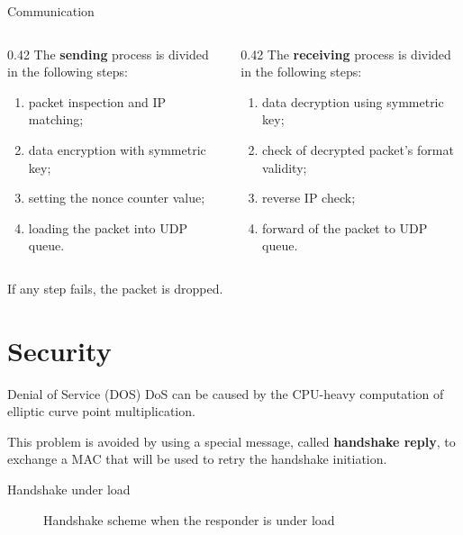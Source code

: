 \documentclass[light]{presenta}
\begin{document}
\begin{frame}{Communication}
  \begin{columns}
    \begin{column}[t]{0.42\paperwidth}
      \justifying
      The \textbf{sending} process is divided in the following steps:
      \begin{enumerate}
        \item packet inspection and IP matching;
        \item data encryption with symmetric key;
        \item setting the nonce counter value;
        \item loading the packet into UDP queue.
      \end{enumerate}
    \end{column}
    \pause
    \begin{column}[t]{0.42\paperwidth}
      \justifying
      The \textbf{receiving} process is divided in the following steps:
      \begin{enumerate}
        \item data decryption using symmetric key;
        \item check of decrypted packet's format validity;
        \item reverse IP check;
        \item forward of the packet to UDP queue.
      \end{enumerate}
    \end{column}
  \end{columns}
  \pause

  \bigskip
  \bigskip
  \centering
  If any step fails, the packet is dropped.
\end{frame}

\section{Security}

\begin{frame}{Denial of Service (DOS)}
  DoS can be caused by the CPU-heavy computation of elliptic curve point multiplication.
  
  \bigskip
  This problem is avoided by using a special message, called \textbf{handshake reply}, to exchange a MAC that will be used to retry the handshake initiation.
\end{frame}

\begin{frame}{Handshake under load}
  \begin{figure}[H]
    \vspace{-10pt}
    
    \caption{Handshake scheme when the responder is under load}
  \end{figure}
\end{frame}
\end{document}
